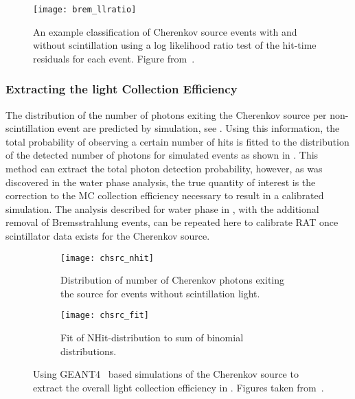 \begin{figure}
\centering
\texttt{[image: brem\_llratio]}
\caption{\label{fig:brem_llratio} An example classification of Cherenkov source events with and without scintillation using a log likelihood ratio test of the hit-time residuals for each event. Figure from~\cite{Heintzelman:2013}.}
\end{figure}


\subsubsection{Extracting the light Collection Efficiency}
The distribution of the number of photons exiting the Cherenkov source per non-scintillation event are predicted by simulation, see . 
Using this information, the total probability of observing a certain number of hits is fitted to the distribution of the detected number of photons for simulated events as shown in .
This method can extract the total photon detection probability, however, as was discovered in the water phase analysis, the true quantity of interest is the correction to the MC collection efficiency necessary to result in a calibrated simulation.
The analysis described for water phase in , with the additional removal of Bremsstrahlung events, can be repeated here to calibrate RAT once scintillator data exists for the Cherenkov source.

\begin{figure}
\begin{subfigure}{.48\textwidth}
\texttt{[image: chsrc\_nhit]}
\caption{Distribution of number of Cherenkov photons exiting the source for events without scintillation light.}
\label{fig:nphotons}
\end{subfigure}
\hspace{0.5cm}
\begin{subfigure}{.48\textwidth}
\texttt{[image: chsrc\_fit]}
\caption{Fit of NHit-distribution to sum of binomial distributions.}
\label{fig:fit}
\end{subfigure}
\caption{Using GEANT4~\cite{geant4} based simulations of the Cherenkov source to extract the overall light collection efficiency in {\snop}. Figures taken from~\cite{Heintzelman:2013}. }
\label{fig:heintzelman-plots}
\end{figure}
 
